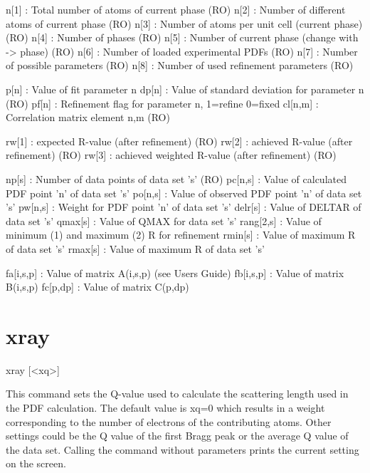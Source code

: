 \begin{MacVerbatim}
n[1]      : Total number of atoms of current phase (RO)
n[2]      : Number of different atoms of current phase (RO)
n[3]      : Number of atoms per unit cell (current phase) (RO)
n[4]      : Number of phases (RO)
n[5]      : Number of current phase (change with -> phase) (RO)
n[6]      : Number of loaded experimental PDFs (RO)
n[7]      : Number of possible parameters (RO)
n[8]      : Number of used refinement parameters (RO)

p[n]      : Value of fit parameter n
dp[n]     : Value of standard deviation for parameter n (RO)
pf[n]     : Refinement flag for parameter n, 1=refine 0=fixed
cl[n,m]   : Correlation matrix element n,m (RO)

rw[1]     : expected R-value (after refinement) (RO)
rw[2]     : achieved R-value (after refinement) (RO)
rw[3]     : achieved weighted R-value (after refinement) (RO)

np[s]     : Number of data points of data set 's' (RO)
pc[n,s]   : Value of calculated PDF point 'n' of data set 's'
po[n,s]   : Value of observed PDF point 'n' of data set 's'
pw[n,s]   : Weight for PDF point 'n' of data set 's'
delr[s]   : Value of DELTAR of data set 's'
qmax[s]   : Value of QMAX for data set 's'
rang[2,s] : Value of minimum (1) and maximum (2) R for refinement
rmin[s]   : Value of maximum R of data set 's'
rmax[s]   : Value of maximum R of data set 's'

fa[i,s,p] : Value of matrix A(i,s,p) (see Users Guide)
fb[i,s,p] : Value of matrix B(i,s,p)
fc[p,dp]  : Value of matrix C(p,dp)
\end{MacVerbatim}
\section{xray}
\begin{MacVerbatim}
xray [<xq>]
\end{MacVerbatim}
This command sets the Q-value used to calculate the scattering 
length used in the PDF calculation. The default value is xq=0 
which results in a weight corresponding to the number of electrons 
of the contributing atoms. Other settings could be the Q value 
of the first Bragg peak or the average Q value of the data set. 
Calling the command without parameters prints the current setting 
on the screen. 
